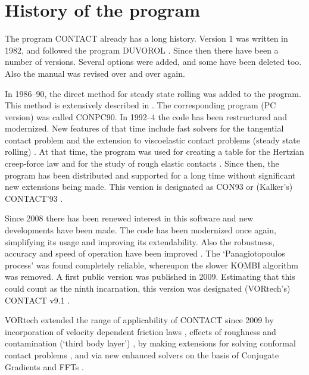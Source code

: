 \documentclass[12pt]{report}
\begin{document}
\section{History of the program}

The program CONTACT already has a long history. Version 1 was written in
1982, and followed the program DUVOROL \cite{Kalker1979a,Tsjoeng1980}. Since
then there have been a number of versions. Several options were added, and
some have been deleted too. Also the manual was revised over and over again.

In 1986--90, the direct method for steady state rolling was added to the
program. This method is extensively described in \cite{Kalker1990}. The
corresponding program (PC version) was called CONPC90. In 1992--4 the code
has been restructured and modernized.  New features of that time include
fast solvers for the tangential contact problem
\cite{Vollebregt1995a-convexgs} and the extension to viscoelastic contact
problems (steady state rolling)
\cite{Wang_guangqiu1992b,Wang_guangqiu1993}. At that time, the program was
used for creating a table for the Hertzian creep-force law
\cite{Kalker1996b-usetab} and for the study of rough elastic contacts
\cite{Kalker1997}. Since then, the program has been distributed and
supported for a long time without significant new extensions being made.
This version is designated as CON93 or (Kalker's) CONTACT'93
\cite{Vollebregt1993f-con93}.

Since 2008 there has been renewed interest in this software and new
developments have been made. The code has been modernized once again,
simplifying its usage and improving its extendability. Also the robustness,
accuracy and speed of operation have been improved
\cite{Vollebregt2009a-cm2009}. The `Panagiotopoulos process' was found
completely reliable, whereupon the slower KOMBI algorithm was removed. A
first public version was published in 2009. Estimating that this could count
as the ninth incarnation, this version was designated (VORtech's) CONTACT
v9.1 \cite{Vollebregt2009b-userguide-v9}.

VORtech extended the range of applicability of CONTACT since 2009 by
incorporation of velocity dependent friction laws
\cite{Vollebregt2014c-tractcurv,Vollebregt2012a-quasistd}, effects of
roughness and contamination (`third body layer') 
\cite{Vollebregt2014c-tractcurv,Vollebregt2021a-soa-paper,
Vollebregt2019a-fra}, by making extensions for solving conformal
contact problems \cite{Vollebregt2018b-corrigendum,
Vollebregt2020c-distr-force,Vollebregt2014d-conformal}, and via new
enhanced solvers on the basis of Conjugate Gradients and FFTs 
\cite{Vollebregt2014a-fftprec,Zhao_Jing2015a-tangcg}. 
\end{document}
